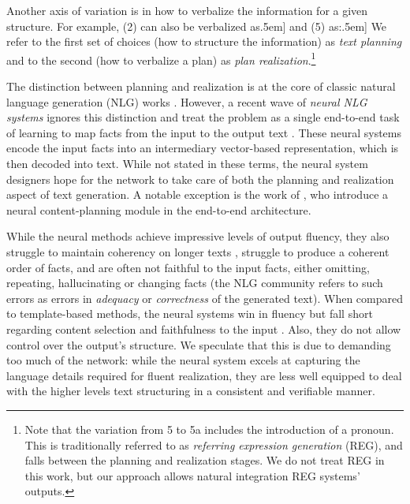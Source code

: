\documentclass[11pt,a4paper]{article}
\begin{document}
Another axis of variation is in how to verbalize the information for a given structure. For example, (2) can also be verbalized as\0.5em] and (5) as:\0.5em]
We refer to the first set of choices (how to structure the information) as \emph{text planning} and to the second (how to verbalize a plan) as \emph{plan realization}.\footnote{Note that the variation from 5 to 5a includes the introduction of a pronoun. This is traditionally referred to as \emph{referring expression generation} (REG), and falls between the planning and realization stages. We do not treat REG in this work, but our approach allows natural integration REG systems' outputs.} 

The distinction between planning and realization is at the core of classic natural language generation (NLG) works \cite{reiter2000building,DBLP:journals/corr/GattK17}. However, a recent wave of \emph{neural NLG systems} ignores this distinction and treat the problem as a single end-to-end task of learning to map facts from the input to the output text \cite{gardent2017webnlg,duvsek2018findings}. These neural systems encode the input facts into an intermediary vector-based representation, which is then decoded into text. While not stated in these terms, the neural system designers hope for the network to take care of both the planning and realization aspect of text generation. A notable exception is the work of \citet{puduppully2018data}, who introduce a neural content-planning module in the end-to-end architecture.


While the neural methods achieve impressive levels of output fluency, they also struggle to maintain coherency on longer texts \cite{wiseman2017challenges}, struggle to produce a coherent order of facts, and are often not faithful to the input facts, either omitting, repeating, hallucinating or changing facts (the NLG community refers to such errors as errors in \emph{adequacy} or \emph{correctness} of the generated text).
When compared to template-based methods, the neural systems win in fluency but fall short regarding content selection and faithfulness to the input \cite{puzikov2018e2e}. Also, they do not allow control over the output's structure.
We speculate that this is due to demanding too much of the network: while the neural system excels at capturing the language details required for fluent realization, they are less well equipped to deal with the higher levels text structuring in a consistent and verifiable manner.
\end{document}
